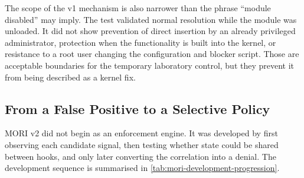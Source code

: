 The scope of the v1 mechanism is also narrower than the phrase ``module
disabled'' may imply. The test validated normal  resolution
while the module was unloaded. It did not show prevention of direct insertion
by an already privileged administrator, protection when the functionality is
built into the kernel, or resistance to a root user changing the configuration
and blocker script. Those are acceptable boundaries for the temporary
laboratory control, but they prevent it from being described as a kernel fix.

\subsection{From a False Positive to a Selective Policy}

MORI v2 did not begin as an enforcement engine. It was developed by first
observing each candidate signal, then testing whether state could be shared
between hooks, and only later converting the correlation into a denial. The
development sequence is summarised in
\cref{tab:mori-development-progression}.


